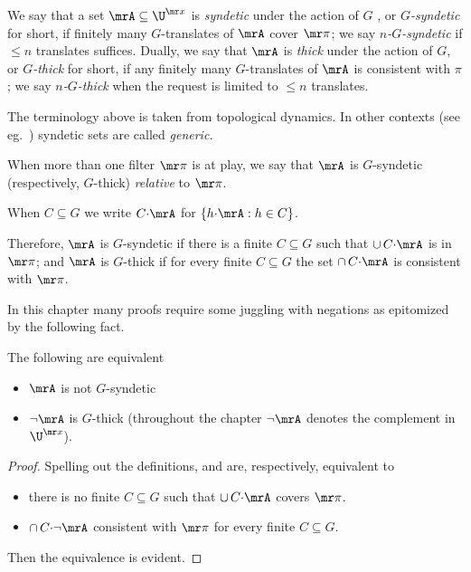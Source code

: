 We say that a set $\mrA\subseteq\U^{\mr x}$ is \emph{syndetic\/} under the action of $G$ , or \emph{$G$-syndetic\/} for short, if finitely many $G$-translates of $\mrA$ cover ${\mr\pi}$; we say \emph{$n$-$G$-syndetic\/} if $\le n$ translates suffices.
Dually, we say that $\mrA$ is \emph{thick\/} under the action of $G$, or \emph{$G$-thick\/} for short, if any finitely many $G$-translates of $\mrA$ is consistent with $\pi$; we say \emph{$n$-$G$-thick\/} when the request is limited to $\le n$ translates.

\noindent\llap{\textcolor{red}{\Large\warning}\kern1.5ex}\ignorespaces
The terminology above is taken from topological dynamics.
In other contexts (see eg.~\cite{Newelski09}) syndetic sets are called \textit{generic.}

When more than one filter ${\mr\pi}$ is at play, we say that $\mrA$ is $G$-syndetic (respectively, $G$-thick) \emph{relative\/} to ${\mr\pi}$.

\begin{notation}
  When $C\subseteq G$ we write \emph{$C{\cdot}\mrA$\/} for $\{h{\cdot}\mrA : h\in C\}$.
\end{notation}

Therefore, $\mrA$ is $G$-syndetic if there is a finite $C\subseteq G$ such that $\cup\,C{\cdot}\mrA$ is in ${\mr\pi}$; and $\mrA$ is $G$-thick if for every finite $C\subseteq G$ the set $\cap\,C{\cdot}\mrA$ is consistent with ${\mr\pi}$.

In this chapter many proofs require some juggling with negations as epitomized by the following fact.

\begin{fact}\label{fact_fip}
  The following are equivalent
  \begin{itemize}
    \item[1.] $\mrA$ is not $G$-syndetic
    \item[2.] $\neg\mrA$ is $G$-thick (throughout the chapter \emph{$\neg\mrA$\/} denotes the complement in $\U^{\mr x}$).
  \end{itemize}\smallskip
\end{fact}

\begin{proof}
  Spelling out the definitions,  and  are, respectively, equivalent to
  \begin{itemize}
    \item[1$'$.] there is no finite $C\subseteq G$ such that $\cup\, C{\cdot}\mrA$ covers ${\mr\pi}$.
    \item[2$'$.] $\cap\, C{\cdot}\neg\mrA$ consistent with ${\mr\pi}$ for every finite $C\subseteq G$.
  \end{itemize} 
  Then the equivalence is evident.
\end{proof}

